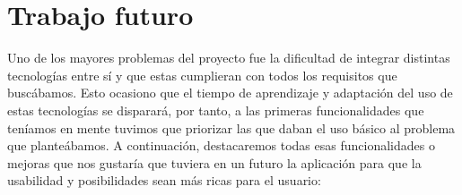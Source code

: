 
\cleardoublepage


\chapter{Trabajo futuro}
\label{makereference6}
Uno de los mayores problemas del proyecto fue la dificultad de integrar
 distintas tecnologías entre sí y que estas cumplieran con todos los requisitos
 que buscábamos. Esto ocasiono que el tiempo de aprendizaje y adaptación del uso
 de estas tecnologías se disparará, por tanto, a las primeras funcionalidades que
 teníamos en mente tuvimos que priorizar las que daban el uso básico al problema
 que planteábamos.
A continuación, destacaremos todas esas funcionalidades o mejoras que nos
 gustaría que tuviera en un futuro la aplicación para que la usabilidad y
 posibilidades sean más ricas para el usuario:
